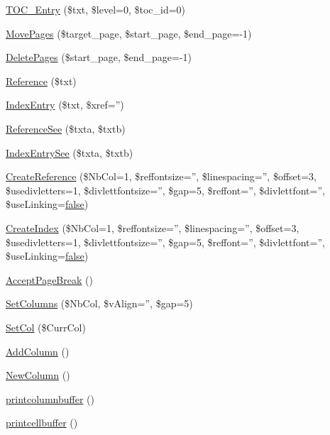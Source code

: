 \begin{DoxyCompactItemize}
\hyperlink{classm_p_d_f_ab38bd7dde5e8d6c2f887271bf2fc524e}{T\-O\-C\-\_\-\-Entry} (\$txt, \$level=0, \$toc\-\_\-id=0)
\item 
\hyperlink{classm_p_d_f_a8647925b2fa7015abfaacf9b40d297c3}{Move\-Pages} (\$target\-\_\-page, \$start\-\_\-page, \$end\-\_\-page=-\/1)
\item 
\hyperlink{classm_p_d_f_a86a5258e48879914ef56aad2744b7563}{Delete\-Pages} (\$start\-\_\-page, \$end\-\_\-page=-\/1)
\item 
\hyperlink{classm_p_d_f_adeb888292f2e56b4a304492512605328}{Reference} (\$txt)
\item 
\hyperlink{classm_p_d_f_a2d776515ca5cd23f2b2301628d5570fc}{Index\-Entry} (\$txt, \$xref='')
\item 
\hyperlink{classm_p_d_f_adf6428c2db4078b5df50038c98556d30}{Reference\-See} (\$txta, \$txtb)
\item 
\hyperlink{classm_p_d_f_a7eff8263a11d45c62c2a9ac559e333da}{Index\-Entry\-See} (\$txta, \$txtb)
\item 
\hyperlink{classm_p_d_f_af214038abf83ac96bd7c0515566afa8e}{Create\-Reference} (\$Nb\-Col=1, \$reffontsize='', \$linespacing='', \$offset=3, \$usedivletters=1, \$divlettfontsize='', \$gap=5, \$reffont='', \$divlettfont='', \$use\-Linking=\hyperlink{ttfontsuni_8php_afbaa04e5cc97693dc668b3c45d3dd740}{false})
\item 
\hyperlink{classm_p_d_f_aa3da5c75b48dbf0873136f560df16233}{Create\-Index} (\$Nb\-Col=1, \$reffontsize='', \$linespacing='', \$offset=3, \$usedivletters=1, \$divlettfontsize='', \$gap=5, \$reffont='', \$divlettfont='', \$use\-Linking=\hyperlink{ttfontsuni_8php_afbaa04e5cc97693dc668b3c45d3dd740}{false})
\item 
\hyperlink{classm_p_d_f_aa1cacc14579f7913ddff835215739362}{Accept\-Page\-Break} ()
\item 
\hyperlink{classm_p_d_f_a9bfb91de1a1fb1c9e21b1fb27a4c06bc}{Set\-Columns} (\$Nb\-Col, \$v\-Align='', \$gap=5)
\item 
\hyperlink{classm_p_d_f_a69a1d0feb6240da2c770d1cac9b01017}{Set\-Col} (\$Curr\-Col)
\item 
\hyperlink{classm_p_d_f_acefa6808a6aaeffdf63ca1b7bfd8d147}{Add\-Column} ()
\item 
\hyperlink{classm_p_d_f_a166eb63a0d9176227fb3708ebd05f5ba}{New\-Column} ()
\item 
\hyperlink{classm_p_d_f_a09a96bcbb016fa259fb34da46f57aa46}{printcolumnbuffer} ()
\item 
\hyperlink{classm_p_d_f_af0b4ea17914c783b8db1154edd91c60b}{printcellbuffer} ()

\end{DoxyCompactItemize}
